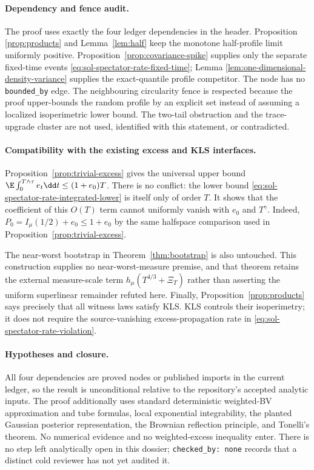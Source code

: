 \documentclass[../main.tex]{subfiles}
\begin{document}
\paragraph{Dependency and fence audit.}
The proof uses exactly the four ledger dependencies in the header.  Proposition
\ref{prop:products} and Lemma~\ref{lem:half} keep the monotone half-profile limit uniformly
positive.  Proposition~\ref{prop:covariance-spike} supplies only the separate fixed-time events
\eqref{eq:sol-spectator-rate-fixed-time}; Lemma
\ref{lem:one-dimensional-density-variance} supplies the exact-quantile profile competitor.
The node has no \texttt{bounded\_by} edge.  The neighbouring circularity fence is respected
because the proof upper-bounds the random profile by an explicit set instead of assuming a
localized isoperimetric lower bound.  The two-tail obstruction and the trace-upgrade cluster are
not used, identified with this statement, or contradicted.

\paragraph{Compatibility with the existing excess and KLS interfaces.}
Proposition~\ref{prop:trivial-excess} gives the universal upper bound
$\E\int_0^{T\wedge\tau}e_t\dd t\le(1+e_0)T$.  There is no conflict: the lower bound
\eqref{eq:sol-spectator-rate-integrated-lower} is itself only of order $T$.  It shows that the
coefficient of this $O(T)$ term cannot uniformly vanish with $e_0$ and $T^\gamma$.  Indeed,
$P_0=I_\mu(1/2)+e_0\le1+e_0$ by the same halfspace comparison used in
Proposition~\ref{prop:trivial-excess}.

The near-worst bootstrap in Theorem~\ref{thm:bootstrap} is also untouched.  This construction
supplies no near-worst-measure premise, and that theorem retains the external measure-scale term
$h_\mu(T^{4/3}+\Xi_T)$ rather than asserting the uniform superlinear remainder refuted here.
Finally, Proposition~\ref{prop:products} says precisely that all witness laws satisfy KLS.  KLS
controls their isoperimetry; it does not require the source-vanishing excess-propagation rate in
\eqref{eq:sol-spectator-rate-violation}.

\paragraph{Hypotheses and closure.}
All four dependencies are proved nodes or published imports in the current ledger, so the result
is unconditional relative to the repository's accepted analytic inputs.  The proof additionally
uses standard deterministic weighted-BV approximation and tube formulas, local exponential
integrability, the planted Gaussian posterior representation, the Brownian reflection principle,
and Tonelli's theorem.  No numerical evidence and no weighted-excess inequality enter.  There is
no step left analytically open in this dossier; \texttt{checked\_by: none} records that a distinct
cold reviewer has not yet audited it.
\end{document}
